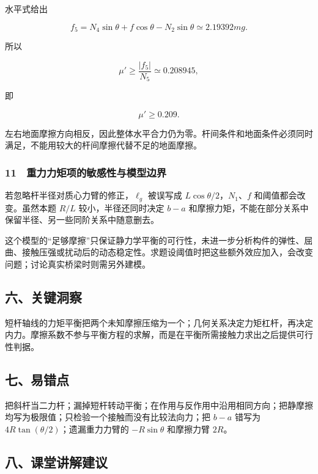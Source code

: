 \documentclass[12pt,a4paper,fontset=fandol]{ctexart}
\begin{document}
水平式给出

\[f_5=N_4\sin\theta+f\cos\theta-N_2\sin\theta
\simeq2.19392mg.\]

所以

\[\mu'\ge\frac{|f_5|}{N_5}\simeq0.208945,\]

即

\[\boxed{\mu'\ge0.209.}\]

左右地面摩擦方向相反，因此整体水平合力仍为零。杆间条件和地面条件必须同时满足，不能用较大的杆间摩擦代替不足的地面摩擦。

\subsubsection{11　重力力矩项的敏感性与模型边界}\label{ux91cdux529bux529bux77e9ux9879ux7684ux654fux611fux6027ux4e0eux6a21ux578bux8fb9ux754c}

若忽略杆半径对质心力臂的修正，\(\ell_g\) 被误写成
\(L\cos\theta/2\)，\(N_1\)、\(f\) 和阈值都会改变。虽然本题 \(R/L\)
较小，半径还同时决定 \(b-a\)
和摩擦力矩，不能在部分关系中保留半径、另一些同阶关系中随意删去。

这个模型的``足够摩擦''只保证静力学平衡的可行性，未进一步分析构件的弹性、屈曲、接触压强或扰动后的动态稳定性。求题设阈值时把这些额外效应加入，会改变问题；讨论真实桥梁时则需另外建模。

\subsection{六、关键洞察}\label{ux516dux5173ux952eux6d1eux5bdf-3}

短杆轴线的力矩平衡把两个未知摩擦压缩为一个；几何关系决定力矩杠杆，再决定内力。摩擦系数不参与平衡方程的求解，而是在平衡所需接触力求出之后提供可行性判据。

\subsection{七、易错点}\label{ux4e03ux6613ux9519ux70b9-3}

把斜杆当二力杆；漏掉短杆转动平衡；在作用与反作用中沿用相同方向；把静摩擦均写为极限值；只检验一个接触而没有比较法向力；把
\(b-a\) 错写为 \(4R\tan(\theta/2)\)；遗漏重力力臂的 \(-R\sin\theta\)
和摩擦力臂 \(2R\)。

\subsection{八、课堂讲解建议}\label{ux516bux8bfeux5802ux8bb2ux89e3ux5efaux8bae-3}
\end{document}
